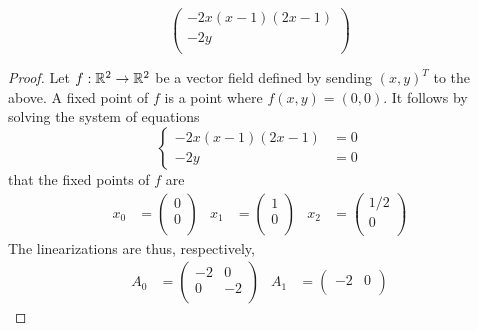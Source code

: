 \documentclass[../psets.tex]{subfiles}
\begin{document}
\begin{enumerate}
\begin{enumerate}
\begin{equation*}
            \begin{pmatrix}
                -2x(x-1)(2x-1)\\
                -2y\\
            \end{pmatrix}
        \end{equation*}
        \begin{proof}
            Let $f:\mathbb{R}^2\to\mathbb{R}^2$ be a vector field defined by sending $(x,y)^T$ to the above. A fixed point of $f$ is a point where $f(x,y)=(0,0)$. It follows by solving the system of equations
            \begin{equation*}
                \begin{cases}
                    -2x(x-1)(2x-1) &= 0\\
                    -2y &= 0
                \end{cases}
            \end{equation*}
            that the fixed points of $f$ are
            \begin{align*}
                x_0 &=
                \begin{pmatrix}
                    0\\
                    0\\
                \end{pmatrix}&
                x_1 &=
                \begin{pmatrix}
                    1\\
                    0\\
                \end{pmatrix}&
                x_2 &=
                \begin{pmatrix}
                    1/2\\
                    0\\
                \end{pmatrix}
            \end{align*}
            The linearizations are thus, respectively,
            \begin{align*}
                A_0 &=
                \begin{pmatrix}
                    -2 & 0\\
                    0 & -2\\
                \end{pmatrix}&
                A_1 &=
                \begin{pmatrix}
                    -2 & 0\\

\end{pmatrix}
\end{align*}
\end{proof}
\end{enumerate}
\end{enumerate}
\end{document}
